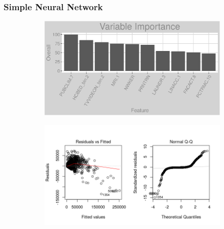 \subsubsection{Simple Neural Network}
\label{appendix:electricity:snn}
\begin{figure}[h]
\centering
\begin{subfigure}{1\textwidth}
\centering
\includegraphics[width=.99\textwidth, height=0.3\textheight]{Images/electricity_nn_vars.png}
\end{subfigure}
\begin{subfigure}{1\textwidth}
\centering
\includegraphics[width=.99\textwidth, height=0.475\textheight]{Images/electricity_nn_res_1.png}
\end{subfigure}
\end{figure}
\FloatBarrier
\newpage
